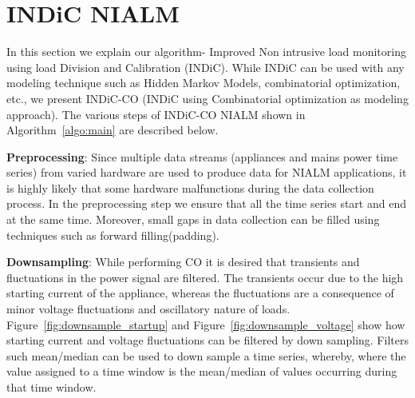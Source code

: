\documentclass[conference]{IEEEtran}
\newcommand{\figref}[1]{Figure~\ref{#1}}
\newcommand{\algoref}[1]{Algorithm~\ref{#1}}
\begin{document}
\section{INDiC NIALM}
In this section we explain our algorithm- Improved Non intrusive load monitoring using load Division and Calibration (INDiC). While INDiC can be used with any modeling technique such as Hidden Markov Models\cite{rabiner}, combinatorial optimization, etc., we present INDiC-CO (INDiC using Combinatorial optimization as modeling approach). The various steps of INDiC-CO NIALM shown in \algoref{algo:main} are described below. 

\textbf{Preprocessing}: Since multiple data streams (appliances and mains power time series) from varied hardware are used to produce data for NIALM applications, it is highly likely that some hardware malfunctions during the data collection process. In the preprocessing step we ensure that all the time series start and end at the same time. Moreover, small gaps in data collection can be filled using techniques such as forward filling(padding).

\textbf{Downsampling}: While performing CO it is desired that transients and fluctuations in the power signal are filtered\cite{hart}. The transients occur due to the high starting current of the appliance, whereas the fluctuations are a consequence of minor voltage fluctuations and oscillatory nature of loads. \figref{fig:downsample_startup} and \figref{fig:downsample_voltage} show how starting current and voltage fluctuations can be filtered by down sampling. Filters such mean/median can be used to down sample a time series, whereby, where the value assigned to a time window is the mean/median of values occurring during that time window.
\end{document}
